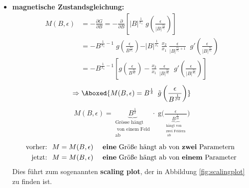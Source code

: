 \documentclass[12pt]{article}
\begin{document}
\begin{itemize}
\item \textbf{magnetische Zustandsgleichung:}
\begin{align}
M(B,\epsilon)& = - \frac{\partial G}{\partial B} = - \frac{\partial}{\partial B} \left[ \vert B \vert ^\frac{1}{x_1} \; g\left( \frac{\epsilon}{\vert B \vert ^\frac{x_2}{x_1}} \right) \right] \\
&= - B^{\frac{1}{x_1}-1} \; g\left( \frac{\epsilon}{B^\frac{x_2}{x_1}}\right) - \vert B \vert ^\frac{1}{x_1} \; \frac{x_2}{x_1} \; \frac{\epsilon}{\vert B \vert ^{\frac{x_2}{x_1}+1} }  \; \; g'\left( \frac{\epsilon}{\vert B \vert ^\frac{x_2}{x_1} }\right) \\
&= - B^{\frac{1}{x_1}-1} \left[ 
g\left( \frac{\epsilon}{B^\frac{x_2}{x_1}}\right) 
- \frac{x_2}{x_1} \; \frac{\epsilon}{\vert B \vert ^{\frac{x_2}{x_1}} } \; \;g'\left( \frac{\epsilon}{\vert B \vert ^\frac{x_2}{x_1} }\right) \right] 
\end{align}
\begin{align}
\Rightarrow \Aboxed{M(B,\epsilon)= B^\frac{1}{\delta} \; \; \tilde{g} \left( \frac{\epsilon}{B^\frac{1}{\beta \delta}} \right)  } \label{Magnetisierung}
\end{align}
\begin{align}
M(B,\epsilon)
= \underbrace{B^\frac{1}{\delta}}_{ \substack{ \text{Grösse hängt} \\ \text{ von einem Feld} \\ \text{ab}}} \cdot \; \text{\~{g}} \Big( \frac{\epsilon}{\underbrace{ B^\frac{1}{\beta \delta}}_{ \substack{ \text{hängt von} \\ \text{zwei Feldern} \\ \text{ ab}}}} \Big) 
\end{align} 
\begin{align*}
\mbox{vorher: } \; & M = M(B,\epsilon) \quad \text{ \textbf{eine} Größe hängt ab von \textbf{zwei} Parametern }\\
\mbox{jetzt: }\; & M = M(B,\epsilon) \quad \text{ \textbf{eine} Größe hängt ab von \textbf{einem} Parameter}
\end{align*}
Dies führt zum sogenannten \textbf{scaling plot}, der in Abbildung \ref{fig:scalingplot} zu finden ist. \\


\end{itemize}
\end{document}
